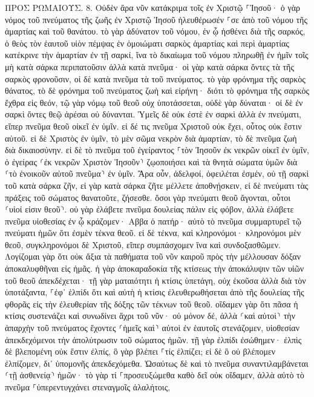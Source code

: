 \documentclass[twoside, 9pt]{extreport}
\begin{document}
ΠΡΟΣ ΡΩΜΑΙΟΥΣ.
8.
Οὐδὲν ἄρα νῦν κατάκριμα τοῖς ἐν Χριστῷ ⸀Ἰησοῦ· 
ὁ γὰρ νόμος τοῦ πνεύματος τῆς ζωῆς ἐν Χριστῷ Ἰησοῦ ἠλευθέρωσέν ⸀σε ἀπὸ τοῦ νόμου τῆς ἁμαρτίας καὶ τοῦ θανάτου. 
τὸ γὰρ ἀδύνατον τοῦ νόμου, ἐν ᾧ ἠσθένει διὰ τῆς σαρκός, ὁ θεὸς τὸν ἑαυτοῦ υἱὸν πέμψας ἐν ὁμοιώματι σαρκὸς ἁμαρτίας καὶ περὶ ἁμαρτίας κατέκρινε τὴν ἁμαρτίαν ἐν τῇ σαρκί, 
ἵνα τὸ δικαίωμα τοῦ νόμου πληρωθῇ ἐν ἡμῖν τοῖς μὴ κατὰ σάρκα περιπατοῦσιν ἀλλὰ κατὰ πνεῦμα· 
οἱ γὰρ κατὰ σάρκα ὄντες τὰ τῆς σαρκὸς φρονοῦσιν, οἱ δὲ κατὰ πνεῦμα τὰ τοῦ πνεύματος. 
τὸ γὰρ φρόνημα τῆς σαρκὸς θάνατος, τὸ δὲ φρόνημα τοῦ πνεύματος ζωὴ καὶ εἰρήνη· 
διότι τὸ φρόνημα τῆς σαρκὸς ἔχθρα εἰς θεόν, τῷ γὰρ νόμῳ τοῦ θεοῦ οὐχ ὑποτάσσεται, οὐδὲ γὰρ δύναται· 
οἱ δὲ ἐν σαρκὶ ὄντες θεῷ ἀρέσαι οὐ δύνανται. 
Ὑμεῖς δὲ οὐκ ἐστὲ ἐν σαρκὶ ἀλλὰ ἐν πνεύματι, εἴπερ πνεῦμα θεοῦ οἰκεῖ ἐν ὑμῖν. εἰ δέ τις πνεῦμα Χριστοῦ οὐκ ἔχει, οὗτος οὐκ ἔστιν αὐτοῦ. 
εἰ δὲ Χριστὸς ἐν ὑμῖν, τὸ μὲν σῶμα νεκρὸν διὰ ἁμαρτίαν, τὸ δὲ πνεῦμα ζωὴ διὰ δικαιοσύνην. 
εἰ δὲ τὸ πνεῦμα τοῦ ἐγείραντος ⸀τὸν Ἰησοῦν ἐκ νεκρῶν οἰκεῖ ἐν ὑμῖν, ὁ ἐγείρας ⸂ἐκ νεκρῶν Χριστὸν Ἰησοῦν⸃ ζῳοποιήσει καὶ τὰ θνητὰ σώματα ὑμῶν διὰ ⸂τὸ ἐνοικοῦν αὐτοῦ πνεῦμα⸃ ἐν ὑμῖν. 
Ἄρα οὖν, ἀδελφοί, ὀφειλέται ἐσμέν, οὐ τῇ σαρκὶ τοῦ κατὰ σάρκα ζῆν, 
εἰ γὰρ κατὰ σάρκα ζῆτε μέλλετε ἀποθνῄσκειν, εἰ δὲ πνεύματι τὰς πράξεις τοῦ σώματος θανατοῦτε, ζήσεσθε. 
ὅσοι γὰρ πνεύματι θεοῦ ἄγονται, οὗτοι ⸂υἱοί εἰσιν θεοῦ⸃. 
οὐ γὰρ ἐλάβετε πνεῦμα δουλείας πάλιν εἰς φόβον, ἀλλὰ ἐλάβετε πνεῦμα υἱοθεσίας ἐν ᾧ κράζομεν· Αββα ὁ πατήρ· 
αὐτὸ τὸ πνεῦμα συμμαρτυρεῖ τῷ πνεύματι ἡμῶν ὅτι ἐσμὲν τέκνα θεοῦ. 
εἰ δὲ τέκνα, καὶ κληρονόμοι· κληρονόμοι μὲν θεοῦ, συγκληρονόμοι δὲ Χριστοῦ, εἴπερ συμπάσχομεν ἵνα καὶ συνδοξασθῶμεν. 
Λογίζομαι γὰρ ὅτι οὐκ ἄξια τὰ παθήματα τοῦ νῦν καιροῦ πρὸς τὴν μέλλουσαν δόξαν ἀποκαλυφθῆναι εἰς ἡμᾶς. 
ἡ γὰρ ἀποκαραδοκία τῆς κτίσεως τὴν ἀποκάλυψιν τῶν υἱῶν τοῦ θεοῦ ἀπεκδέχεται· 
τῇ γὰρ ματαιότητι ἡ κτίσις ὑπετάγη, οὐχ ἑκοῦσα ἀλλὰ διὰ τὸν ὑποτάξαντα, ⸀ἐφ᾽ ἑλπίδι 
ὅτι καὶ αὐτὴ ἡ κτίσις ἐλευθερωθήσεται ἀπὸ τῆς δουλείας τῆς φθορᾶς εἰς τὴν ἐλευθερίαν τῆς δόξης τῶν τέκνων τοῦ θεοῦ. 
οἴδαμεν γὰρ ὅτι πᾶσα ἡ κτίσις συστενάζει καὶ συνωδίνει ἄχρι τοῦ νῦν· 
οὐ μόνον δέ, ἀλλὰ ⸂καὶ αὐτοὶ⸃ τὴν ἀπαρχὴν τοῦ πνεύματος ἔχοντες ⸂ἡμεῖς καὶ⸃ αὐτοὶ ἐν ἑαυτοῖς στενάζομεν, υἱοθεσίαν ἀπεκδεχόμενοι τὴν ἀπολύτρωσιν τοῦ σώματος ἡμῶν. 
τῇ γὰρ ἐλπίδι ἐσώθημεν· ἐλπὶς δὲ βλεπομένη οὐκ ἔστιν ἐλπίς, ὃ γὰρ βλέπει ⸀τίς ἐλπίζει; 
εἰ δὲ ὃ οὐ βλέπομεν ἐλπίζομεν, δι᾽ ὑπομονῆς ἀπεκδεχόμεθα. 
Ὡσαύτως δὲ καὶ τὸ πνεῦμα συναντιλαμβάνεται ⸂τῇ ἀσθενείᾳ⸃ ἡμῶν· τὸ γὰρ τί ⸀προσευξώμεθα καθὸ δεῖ οὐκ οἴδαμεν, ἀλλὰ αὐτὸ τὸ πνεῦμα ⸀ὑπερεντυγχάνει στεναγμοῖς ἀλαλήτοις, 
\end{document}
